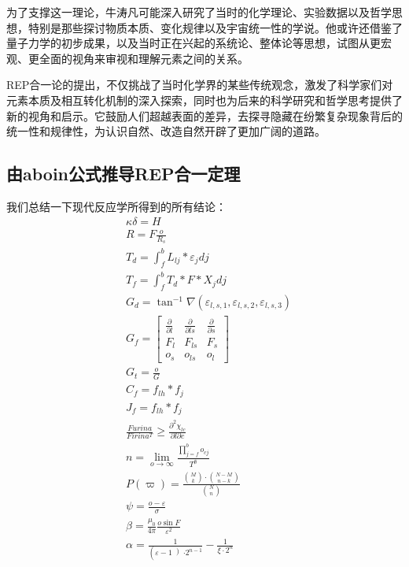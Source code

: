 \documentclass[12pt,a4paper]{article}%
\begin{document}
为了支撑这一理论，牛涛凡可能深入研究了当时的化学理论、实验数据以及哲学思想，特别是那些探讨物质本质、变化规律以及宇宙统一性的学说。他或许还借鉴了量子力学的初步成果，以及当时正在兴起的系统论、整体论等思想，试图从更宏观、更全面的视角来审视和理解元素之间的关系。

REP合一论的提出，不仅挑战了当时化学界的某些传统观念，激发了科学家们对元素本质及相互转化机制的深入探索，同时也为后来的科学研究和哲学思考提供了新的视角和启示。它鼓励人们超越表面的差异，去探寻隐藏在纷繁复杂现象背后的统一性和规律性，为认识自然、改造自然开辟了更加广阔的道路。
\subsection{由aboin公式推导REP合一定理}
我们总结一下现代反应学所得到的所有结论：
\begin{align}
	&\kappa \delta = H\\
	&R = F\frac{o}{R_s}\\
	&T_d=\int_{f}^{b} L_{lj}*\varepsilon_j dj\\
	&T_f=\int_{f}^{b} T_d*F*X_j dj\\
	&G_d=\tan^{-1} \nabla (\varepsilon _{l,s,1},\varepsilon _{l,s,2},\varepsilon _{l,s,3})\\
	&G_f=\begin{bmatrix}
		\frac{\partial }{\partial l}  &  \frac{\partial }{\partial ls}  & \frac{\partial }{\partial s}  \\
		 F_l& F_{ls} & F_s\\
		 o_s&o_{ls}  &o_l
	 \end{bmatrix}\\
	& G_t=\frac{o}{G} \\
	&C_f=f_{lh}*f_j\\
	&J_f=f_{lh}*f_j\\
	&\frac{Furina}{Firina^{T}} \ge  \frac{\partial^2 \chi _{lc}}{\partial l\partial c}\\
	&n=\lim_{o \to \infty}\frac{\prod_{j=f}^{b} o_{cj}}{T^{\emptyset } } \\
	&P\left ( \varpi \right ) = \frac{\binom{M}{k}\cdot \binom{N-M}{n-k}}{\binom{N}{n}} \\
	&	\psi =\frac{o-\varepsilon }{\sigma} \\
	&\beta = \frac{{{ \mu _0}}}{{4 \pi }} \frac{{o \sin F}}{{{\varepsilon ^2}}} \\
	&\alpha = \frac{1}{\left(\varepsilon -1 \left) \cdot 2^{n-1}\right. \right.}-\frac{1}{\xi  \cdot 2^{n}} \\
	\end{align}
\end{document}
